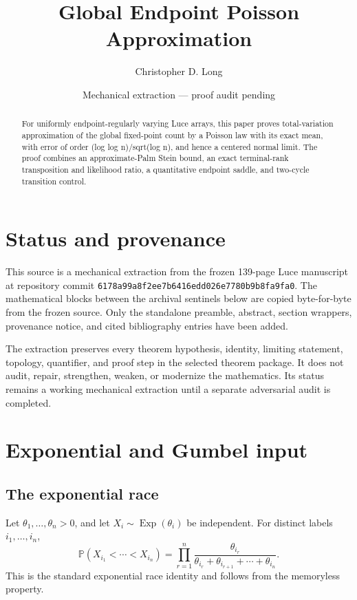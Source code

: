 \documentclass[11pt]{article}
\title{Global Endpoint Poisson Approximation}
\author{Christopher D. Long}
\date{Mechanical extraction --- proof audit pending}
\theoremstyle{remark}
\newcommand{\Pp}{\mathbb P}
\newcommand{\Exp}{\operatorname{Exp}}
\begin{document}
\maketitle
\begin{abstract}
For uniformly endpoint-regularly varying Luce arrays, this paper proves total-variation approximation of the global fixed-point count by a Poisson law with its exact mean, with error of order (log log n)/sqrt(log n), and hence a centered normal limit. The proof combines an approximate-Palm Stein bound, an exact terminal-rank transposition and likelihood ratio, a quantitative endpoint saddle, and two-cycle transition control.
\end{abstract}
\tableofcontents
\section{Status and provenance}
This source is a mechanical extraction from the frozen 139-page Luce manuscript at repository commit \texttt{6178a99a8f2ee7b6416edd026e7780b9b8fa9fa0}. The mathematical blocks between the archival sentinels below are copied byte-for-byte from the frozen source. Only the standalone preamble, abstract, section wrappers, provenance notice, and cited bibliography entries have been added.

The extraction preserves every theorem hypothesis, identity, limiting statement, topology, quantifier, and proof step in the selected theorem package. It does not audit, repair, strengthen, weaken, or modernize the mathematics. Its status remains a working mechanical extraction until a separate adversarial audit is completed.

\section{Exponential and Gumbel input}

\subsection{The exponential race}
Let \(\theta_1,\ldots,\theta_n>0\), and let \(X_i\sim\Exp(\theta_i)\) be independent.  For distinct labels \(i_1,\ldots,i_n\),
\[
\Pp(X_{i_1}<\cdots<X_{i_n})
= \prod_{r=1}^n
 \frac{\theta_{i_r}}{\theta_{i_r}+\theta_{i_{r+1}}+\cdots+\theta_{i_n}}.
\]
This is the standard exponential race identity and follows from the memoryless property.


\end{document}
